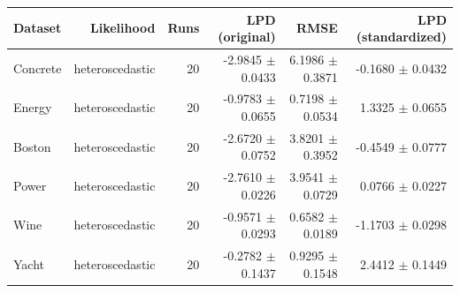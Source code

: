 \begin{tabular}{lrrrrr}
\toprule
Dataset & Likelihood & Runs & LPD (original) & RMSE & LPD (standardized) \\
\midrule
Concrete & heteroscedastic & 20 & -2.9845 $\pm$ 0.0433 & 6.1986 $\pm$ 0.3871 & -0.1680 $\pm$ 0.0432 \\
Energy & heteroscedastic & 20 & -0.9783 $\pm$ 0.0655 & 0.7198 $\pm$ 0.0534 & 1.3325 $\pm$ 0.0655 \\
Boston & heteroscedastic & 20 & -2.6720 $\pm$ 0.0752 & 3.8201 $\pm$ 0.3952 & -0.4549 $\pm$ 0.0777 \\
Power & heteroscedastic & 20 & -2.7610 $\pm$ 0.0226 & 3.9541 $\pm$ 0.0729 & 0.0766 $\pm$ 0.0227 \\
Wine & heteroscedastic & 20 & -0.9571 $\pm$ 0.0293 & 0.6582 $\pm$ 0.0189 & -1.1703 $\pm$ 0.0298 \\
Yacht & heteroscedastic & 20 & -0.2782 $\pm$ 0.1437 & 0.9295 $\pm$ 0.1548 & 2.4412 $\pm$ 0.1449 \\
\bottomrule
\end{tabular}

